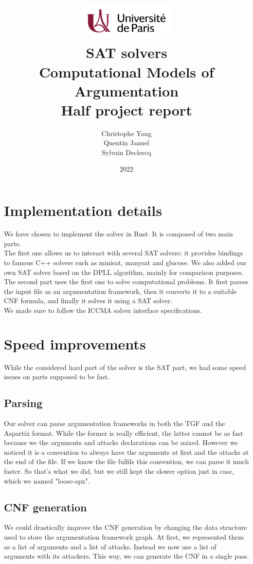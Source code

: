 \documentclass[11pt]{article}
\title{
	\centering
	\includegraphics[width=5cm]{univ-logo} \\
	\vspace{5cm}
	\textbf{SAT solvers} \\
	Computational Models of Argumentation \\
	Half project report
	\vspace{5cm}
}
\author{
    Christophe Yang \\
    Quentin Januel \\
    Sylvain Declercq
}
\date{2022}
\begin{document}
\maketitle
\newpage

\section{Implementation details}
We have chosen to implement the solver in Rust. It is composed of two main parts. \\
The first one allows us to interact with several SAT solvers: it provides bindings to famous C++ solvers such as minisat, manysat and glucose. We also added our own SAT solver based on the DPLL algorithm, mainly for comparison purposes. \\
The second part uses the first one to solve computational problems. It first parses the input file as an argumentation framework, then it converts it to a suitable CNF formula, and finally it solves it using a SAT solver. \\
We made sure to follow the ICCMA solver interface specifications\cite{iccma}.

\section{Speed improvements}
While the considered hard part of the solver is the SAT part, we had some speed issues on parts supposed to be fast.
\subsection{Parsing}
Our solver can parse argumentation frameworks in both the TGF and the Aspartix format. While the former is really efficient, the latter cannot be as fast because we the arguments and attacks declarations can be mixed. However we noticed it is a convention to always have the arguments at first and the attacks at the end of the file. If we know the file fulfils this convention, we can parse it much faster. So that's what we did, but we still kept the slower option just in case, which we named "loose-apx".
\subsection{CNF generation}
We could drastically improve the CNF generation by changing the data structure used to store the argumentation framework graph. At first, we represented them as a list of arguments and a list of attacks. Instead we now use a list of arguments with its attackers. This way, we can generate the CNF in a single pass.
\end{document}

